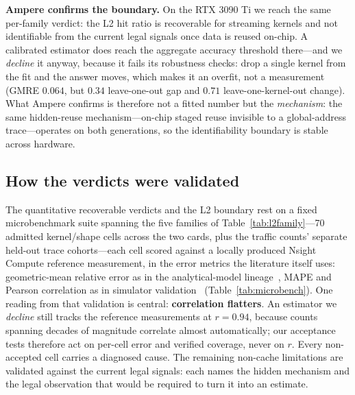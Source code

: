 \documentclass[conference]{IEEEtran}
\begin{document}
\noindent\textbf{Ampere confirms the boundary.} On the RTX 3090 Ti we reach the
same per-family verdict: the L2 hit ratio is recoverable for streaming
kernels and not identifiable from the current legal signals once data is reused on-chip. A calibrated
estimator does reach the aggregate accuracy threshold there---and we
\emph{decline} it anyway, because it fails its robustness checks: drop a
single kernel from the fit and the answer moves, which makes it an overfit,
not a measurement (GMRE $0.064$, but $0.34$ leave-one-out gap and $0.71$
leave-one-kernel-out change). What Ampere
confirms is therefore not a fitted number but the \emph{mechanism}: the
same hidden-reuse mechanism---on-chip staged reuse invisible to a global-address
trace---operates on both generations, so the identifiability boundary is
stable across hardware.


\subsection{How the verdicts were validated}
\label{sec:microbench}
The quantitative recoverable verdicts and the L2 boundary rest on a fixed
microbenchmark suite spanning the five families of Table~\ref{tab:l2family}---70
admitted kernel/shape cells across the two cards, plus the traffic counts'
separate held-out trace cohorts---each cell scored against a locally produced
Nsight Compute reference measurement, in the error metrics the literature itself uses:
geometric-mean
relative error as in the analytical-model
lineage~\cite{hong2009analytical,lee2022gcom}, MAPE and Pearson correlation
as in simulator validation~\cite{bakhoda2009gpgpusim,khairy2020accelsim}
(Table~\ref{tab:microbench}). One reading from that validation is central:
\textbf{correlation flatters}. An estimator we \emph{decline} still tracks
the reference measurements at $r{=}0.94$, because counts spanning decades of magnitude
correlate almost automatically; our acceptance tests therefore act on per-cell error
and verified coverage, never on $r$. Every non-accepted cell carries a
diagnosed cause. The remaining non-cache limitations are
validated against the current legal signals: each names the hidden mechanism and
the legal observation that would be required to turn it into an estimate.
\end{document}
